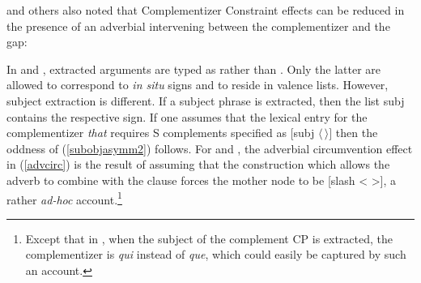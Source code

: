 \documentclass[output=paper
 	        ,biblatex
                ,babelshorthands
                ,newtxmath
                ,draftmode
                ,colorlinks, citecolor=brown
]{langscibook}
\begin{document}
\eal   \label{subobjasymm2}
\zl



\noindent
\citet{Bresnan:77} and others also noted that  Complementizer Constraint effects can be
reduced in the presence of an adverbial intervening between the complementizer and the gap:

\eal \label{advcirc}
\zl

\noindent
In \citet{bouma} and \citet{ginzsag}, extracted arguments are typed as  rather than . Only the latter are allowed to correspond to \emph{in situ} signs and to reside in valence lists. However, subject extraction is different. If a subject phrase is extracted, then the list {\sc subj} contains the respective  sign. If one assumes that the lexical entry for the complementizer \emph{that} requires  S complements specified as $[${\sc subj} $\langle \, \rangle]$ then the oddness of  (\ref{subobjasymm2}) follows. For  \citet{bouma} and \citet{ginzsag}, the adverbial circumvention effect in (\ref{advcirc}) is the result of assuming that the construction which allows the adverb to combine with the clause forces the mother node to be [{\sc slash} < >], a rather \emph{ad-hoc} account.\footnote{Except that in , when the subject of the complement CP is extracted, the complementizer is {\it qui} instead of {\it que}, which could easily be captured by such an account.}
\end{document}
